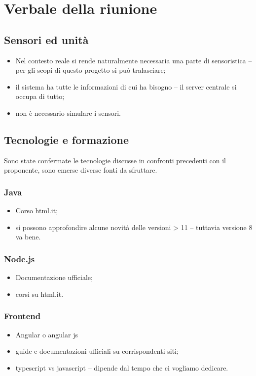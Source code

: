 \section{Verbale della riunione}

\subsection{Sensori ed unità}
\begin{itemize}
    \item Nel contesto reale si rende naturalmente necessaria una parte di sensoristica
    \subitem -- per gli scopi di questo progetto si può tralasciare;
    \item il sistema ha tutte le informazioni di cui ha bisogno
    \subitem -- il server centrale si occupa di tutto;
    \item non è necessario simulare i sensori.
\end{itemize}

\subsection{Tecnologie e formazione}
Sono state confermate le tecnologie discusse in confronti precedenti con il proponente, sono emerse diverse fonti da sfruttare.
    \subsubsection{Java}
        \begin{itemize}
            \item Corso html.it;
            \item si possono approfondire alcune novità delle versioni > 11
                \subitem -- tuttavia versione 8 va bene.
        \end{itemize}

    \subsubsection{Node.js}
        \begin{itemize}
            \item Documentazione ufficiale;
            \item corsi su html.it.
        \end{itemize}

    \subsubsection{Frontend}
        \begin{itemize}
            \item Angular o angular js
            \item guide e documentazioni ufficiali su corrispondenti siti;
            \item typescript vs javascript
                \subitem -- dipende dal tempo che ci vogliamo dedicare.
        \end{itemize}

